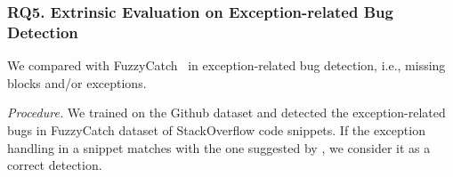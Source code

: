 





%



\subsubsection{RQ5. Extrinsic Evaluation on Exception-related Bug Detection}
 We compared with
FuzzyCatch~\cite{xrank-fse20} in exception-related
bug detection, i.e., missing  blocks and/or exceptions.



{\em Procedure.} We trained {\tool} on the Github dataset and detected
the exception-related bugs in FuzzyCatch dataset of StackOverflow
code snippets. If the exception handling in a snippet matches with
the one suggested by {\tool}, we consider it as a correct detection.


